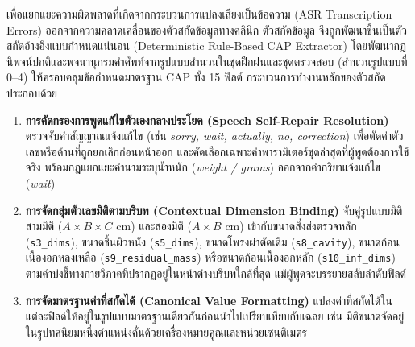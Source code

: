 เพื่อแยกแยะความผิดพลาดที่เกิดจากกระบวนการแปลงเสียงเป็นข้อความ (ASR Transcription Errors) ออกจากความคลาดเคลื่อนของตัวสกัดข้อมูลทางคลินิก ตัวสกัดข้อมูล  จึงถูกพัฒนาขึ้นเป็นตัวสกัดอ้างอิงแบบกำหนดแน่นอน (Deterministic Rule-Based CAP Extractor) โดยพัฒนากฎนิพจน์ปกติและพจนานุกรมคำศัพท์จากรูปแบบสำนวนในชุดฝึกฝนและชุดตรวจสอบ (สำนวนรูปแบบที่ 0--4) ให้ครอบคลุมข้อกำหนดมาตรฐาน CAP ทั้ง 15 ฟิลด์ \cite{cap_breast,honnibal2020spacy} กระบวนการทำงานหลักของตัวสกัดประกอบด้วย
\begin{enumerate}[label=(\arabic*), leftmargin=*, align=left]
    \item \textbf{การคัดกรองการพูดแก้ไขตัวเองกลางประโยค (Speech Self-Repair Resolution)} ตรวจจับคำสัญญาณแจ้งแก้ไข (เช่น \textit{sorry, wait, actually, no, correction}) เพื่อตัดค่าตัวเลขหรือด้านที่ถูกยกเลิกก่อนหน้าออก และคัดเลือกเฉพาะค่าพารามิเตอร์ชุดล่าสุดที่ผู้พูดต้องการใช้จริง พร้อมกฎแยกแยะคำนามระบุน้ำหนัก (\textit{weight / grams}) ออกจากคำกริยาแจ้งแก้ไข (\textit{wait})
    \item \textbf{การจัดกลุ่มตัวเลขมิติตามบริบท (Contextual Dimension Binding)} จับคู่รูปแบบมิติสามมิติ ($A \times B \times C\text{ cm}$) และสองมิติ ($A \times B\text{ cm}$) เข้ากับขนาดสิ่งส่งตรวจหลัก (\texttt{s3\_dims}), ขนาดชิ้นผิวหนัง (\texttt{s5\_dims}), ขนาดโพรงผ่าตัดเดิม (\texttt{s8\_cavity}), ขนาดก้อนเนื้องอกหลงเหลือ (\texttt{s9\_residual\_mass}) หรือขนาดก้อนเนื้องอกหลัก (\texttt{s10\_inf\_dims}) ตามคำบ่งชี้ทางกายวิภาคที่ปรากฏอยู่ในหน้าต่างบริบทใกล้ที่สุด แม้ผู้พูดจะบรรยายสลับลำดับฟิลด์
    \item \textbf{การจัดมาตรฐานค่าที่สกัดได้ (Canonical Value Formatting)} แปลงค่าที่สกัดได้ในแต่ละฟิลด์ให้อยู่ในรูปแบบมาตรฐานเดียวกันก่อนนำไปเปรียบเทียบกับเฉลย เช่น มิติขนาดจัดอยู่ในรูปทศนิยมหนึ่งตำแหน่งคั่นด้วยเครื่องหมายคูณและหน่วยเซนติเมตร 
\end{enumerate}

